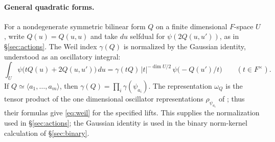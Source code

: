 \documentclass[11pt,oneside,notitlepage]{book}
\numberwithin{equation}{section}
\theoremstyle{plain}
\theoremstyle{definition}
\begin{document}
\paragraph{General quadratic forms.}
For a nondegenerate symmetric bilinear form $Q$ on a finite dimensional $F$-space $U$, write $Q(u)=Q(u,u)$ and take $du$ selfdual for $\psi(2Q(u,u'))$, as in \S\ref{sec:actions}. The Weil index $\gamma(Q)$ is normalized by the Gaussian identity, understood as an oscillatory integral:
\begin{equation}\label{eq:gauss}
\int_U\psi\bigl(tQ(u)+2Q(u,u')\bigr)\,du=\gamma(tQ)\,|t|^{-\dim U/2}\,\psi\bigl(-Q(u')/t\bigr)\qquad(t\in F^\times).
\end{equation}
If $Q\simeq\langle a_1,\dots,a_m\rangle$, then $\gamma(Q)=\prod_i\gamma(\psi_{a_i})$. The representation $\omega_Q$ is the tensor product of the one dimensional oscillator representations $\rho_{\psi_{a_i}}$ of ; thus their formulas give \eqref{eq:weil} for the specified lifts. This supplies the normalization used in \S\ref{sec:actions}; the Gaussian identity is used in the binary norm-kernel calculation of \S\ref{sec:binary}.
\end{document}
